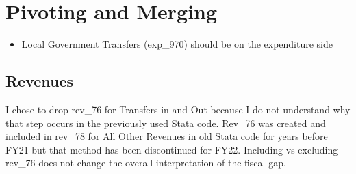 \documentclass[
  letterpaper,
  DIV=11,
  numbers=noendperiod]{scrreport}
\providecommand{\tightlist}{%
  \setlength{\itemsep}{0pt}\setlength{\parskip}{0pt}}\usepackage{longtable,booktabs,array}
\begin{document}
\hypertarget{pivoting-and-merging}{%
\section{Pivoting and Merging}\label{pivoting-and-merging}}

\begin{itemize}
\tightlist
\item
  Local Government Transfers (exp\_970) should be on the expenditure
  side
\end{itemize}

\hypertarget{revenues}{%
\subsection{Revenues}\label{revenues}}

I chose to drop rev\_76 for Transfers in and Out because I do not
understand why that step occurs in the previously used Stata code.
Rev\_76 was created and included in rev\_78 for All Other Revenues in
old Stata code for years before FY21 but that method has been
discontinued for FY22. Including vs excluding rev\_76 does not change
the overall interpretation of the fiscal gap.
\end{document}
